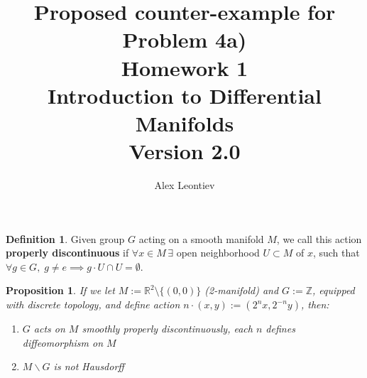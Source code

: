\documentclass[8pt]{article} %
\title{Proposed counter-example for Problem 4a)\\
Homework 1\\
Introduction to Differential Manifolds\\
Version 2.0}
\author{Alex Leontiev}
\theoremstyle{definition}
\newtheorem{mydef}{Definition}
\theoremstyle{plain}
\newtheorem{myprop}{Proposition}
\begin{document}
\maketitle
\begin{mydef}
	Given group $G$ acting on a smooth manifold $M$, we call this action {\bf properly discontinuous} if $\forall x\in M\,\exists$ open
	neighborhood $U\subset M$ of $x$, such that $\forall g\in G,\;g\neq e\implies g\cdot U\cap U=\emptyset$.
\end{mydef}
\begin{myprop}
	If we let $M:=\mathbb{R}^2\setminus\{(0,0)\}$ (2-manifold) and $G:=\mathbb{Z}$, equipped with discrete topology, and define action
	$n\cdot(x,y):=(2^nx,2^{-n}y)$, then:
	\begin{enumerate}
		\item{$G$ acts on $M$ smoothly properly discontinuously, each $n$ defines diffeomorphism on $M$}
		\item{$M\backslash G$ is not Hausdorff}
	\end{enumerate}
\end{myprop}
\end{document}
